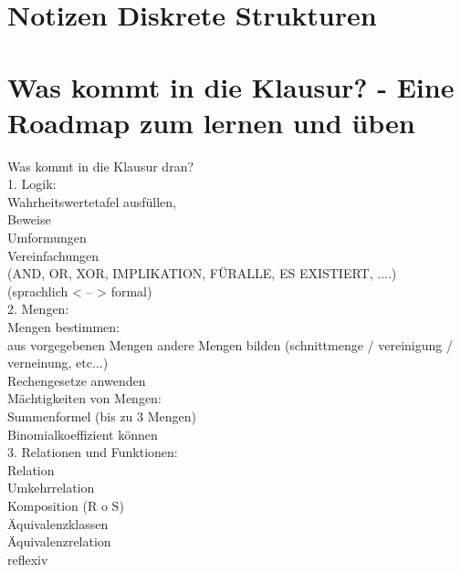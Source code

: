 \documentclass{article}
\begin{document}
	\section*{Notizen Diskrete Strukturen}
	\section*{Was kommt in die Klausur? - Eine Roadmap zum lernen und üben}
	Was kommt in die Klausur dran? \\
	1. Logik: \\
	
	Wahrheitswertetafel ausfüllen, \\
	
	Beweise \\
	
	Umformungen \\
	
	Vereinfachungen \\
	
	(AND, OR, XOR, IMPLIKATION, FÜRALLE, ES EXISTIERT, ....) \\
	
	(sprachlich < -- > formal) \\
	
	
	2. Mengen: \\
	
	Mengen bestimmen: \\
	
	aus vorgegebenen Mengen andere Mengen bilden (schnittmenge / vereinigung / verneinung, etc...) \\
	
	Rechengesetze anwenden \\
	
	Mächtigkeiten von Mengen: \\
	
	Summenformel (bis zu 3 Mengen) \\
	
	Binomialkoeffizient können \\
	
	
	3. Relationen und Funktionen: \\
	Relation \\ 
	Umkehrrelation \\
	Komposition (R o S) \\
	Äquivalenzklassen \\
	Äquivalenzrelation \\
	
	reflexiv \\
	
\end{document}

